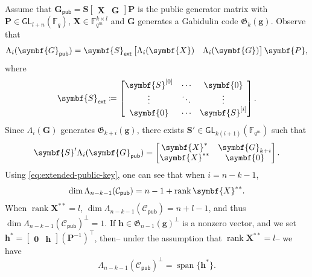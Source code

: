 \documentclass[version=last, paper=A4, parskip=half, oneside]{scrbook}
\theoremstyle{plain}
\theoremstyle{definition}
\theoremstyle{remark}
\renewcommand*{\vec}{\symbf}
\newcommand*{\mat}{\symbf}
\newcommand*{\trans}{\top}%
\DeclareMathOperator{\rank}{rank}
\DeclareMathOperator{\lspan}{span}
\newcommand*{\GL}{\ensuremath{\mathsf{GL}}}
\newcommand*{\pub}{\ensuremath{\mathsf{pub}}}
\newcommand*{\FF}{\ensuremath{\mathbb{F}}}
\newcommand*{\Gab}{\ensuremath{\mathfrak{G}}}
\newcommand*{\ext}{\ensuremath{\mathsf{ext}}}
\begin{document}
Assume that
\(\mat{G}_{\pub} = \mat{S} \begin{bmatrix} \mat{X} & \mat{G}\end{bmatrix} \mat{P}\)
is the public generator matrix with \(\mat{P} \in \GL_{l + n}( \FF_q)\),
\(\mat{X} \in \FF_{q^m}^{k \times l}\) and \(\mat{G}\) generates a Gabidulin
code \(\Gab_k(\vec{g})\).  Observe that
\[
  \Lambda_i(\mat{G}_{\pub}) =
  \mat{S}_{\ext} \begin{bmatrix} \Lambda_i(\mat{X}) & \Lambda_i(\mat{G}) \end{bmatrix} \mat{P}\text,
\]
where
\[
  \mat{S}_{\ext} \coloneqq
  \begin{bmatrix}
    \mat{S}^{[0]} & \cdots & \mat{0} \\
    \vdots & \ddots & \vdots \\
    \mat{0} & \cdots & \mat{S}^{[i]}
  \end{bmatrix}\text.
\]
Since \(\Lambda_i(\mat{G})\) generates \(\Gab_{k + i}(\vec{g})\), there exists
\(\mat{S}' \in \GL_{k (i + 1)}(\FF_{q^m})\) such that
\begin{equation}\label{eq:extended-public-key}
  \mat{S}' \Lambda_i(\mat{G}_{\pub}) =
  \begin{bmatrix}
    \mat{X}^* & \mat{G}_{k + i} \\
    \mat{X}^{**} & \mat{0}
  \end{bmatrix}\text.
\end{equation}
Using \cref{eq:extended-public-key}, one can see that when \(i = n - k - 1\),
\[
  \dim \Lambda_{n - k - 1}(\mathcal{C}_{\pub}) = n - 1 + \rank \mat{X}^{**}\text.
\]
When \(\rank \mat{X}^{**} = l\),
\(\dim \Lambda_{n - k - 1}(\mathcal{C}_{\pub}) = n + l - 1\), and thus
\(\dim {\Lambda_{n - k - 1}(\mathcal{C}_{\pub})}^{\perp} = 1\).  If
\(\vec{h} \in {\Gab_{n - 1}(\vec{g})}^{\perp}\) is a nonzero vector, and we set
\(\vec{h}^* = \begin{bmatrix} \vec{0} & \vec{h} \end{bmatrix} {(\mat{P}^{-1})}^{\trans}\),
then\--- under the assumption that \(\rank \mat{X}^{**} = l\)\--- we have
\begin{equation}\label{eq:spanning-the-dual}
  {\Lambda_{n - k - 1}(\mathcal{C}_{\pub})}^{\perp} = \lspan\{\vec{h}^*\}.
\end{equation}
\end{document}
